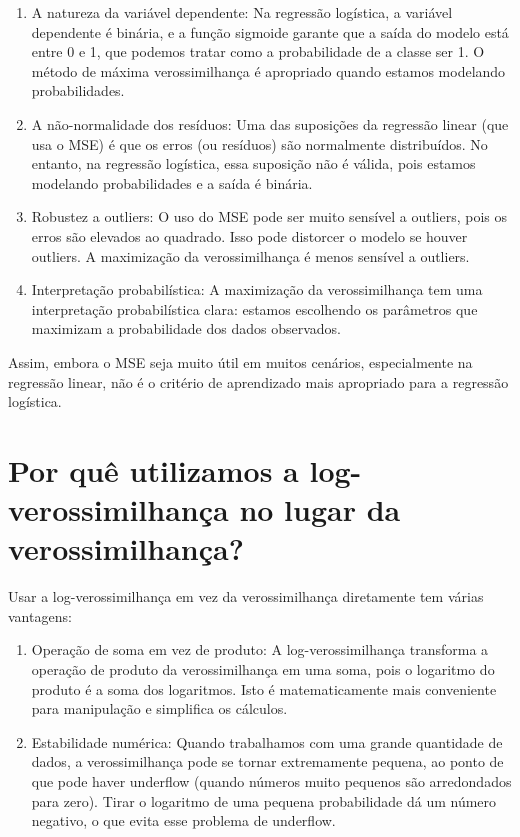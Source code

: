 \documentclass[12pt,a4paper, brazil]{article}
\begin{document}
\begin{enumerate}

  \item A natureza da variável dependente: Na regressão logística, a variável dependente é binária, e a função sigmoide garante que a saída do modelo está entre 0 e 1, que podemos tratar como a probabilidade de a classe ser 1. O método de máxima verossimilhança é apropriado quando estamos modelando probabilidades.

  \item A não-normalidade dos resíduos: Uma das suposições da regressão linear (que usa o MSE) é que os erros (ou resíduos) são normalmente distribuídos. No entanto, na regressão logística, essa suposição não é válida, pois estamos modelando probabilidades e a saída é binária.

  \item Robustez a outliers: O uso do MSE pode ser muito sensível a outliers, pois os erros são elevados ao quadrado. Isso pode distorcer o modelo se houver outliers. A maximização da verossimilhança é menos sensível a outliers.

  \item Interpretação probabilística: A maximização da verossimilhança tem uma interpretação probabilística clara: estamos escolhendo os parâmetros que maximizam a probabilidade dos dados observados.
\end{enumerate}

Assim, embora o MSE seja muito útil em muitos cenários, especialmente na regressão linear, não é o critério de aprendizado mais apropriado para a regressão logística.

\section{Por quê utilizamos a log-verossimilhança no lugar da verossimilhança?}
  
Usar a log-verossimilhança em vez da verossimilhança diretamente tem várias vantagens:

\begin{enumerate}
  \item Operação de soma em vez de produto: A log-verossimilhança transforma a operação de produto da verossimilhança em uma soma, pois o logaritmo do produto é a soma dos logaritmos. Isto é matematicamente mais conveniente para manipulação e simplifica os cálculos.

  \item Estabilidade numérica: Quando trabalhamos com uma grande quantidade de dados, a verossimilhança pode se tornar extremamente pequena, ao ponto de que pode haver underflow (quando números muito pequenos são arredondados para zero). Tirar o logaritmo de uma pequena probabilidade dá um número negativo, o que evita esse problema de underflow.

\end{enumerate}
\end{document}
